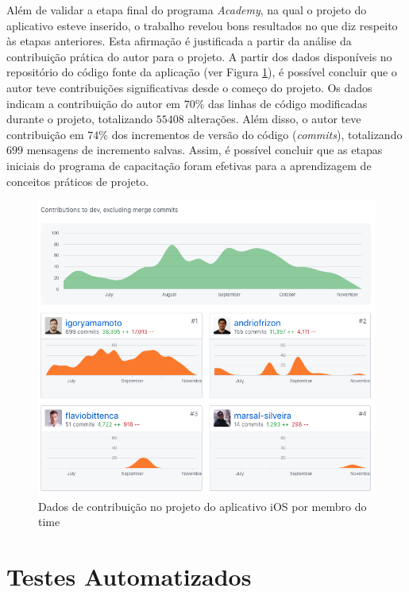 Além de validar a etapa final do programa \textit{Academy}, na qual o projeto do aplicativo esteve inserido, o trabalho revelou bons resultados no que diz respeito às etapas anteriores. Esta afirmação é justificada a partir da análise da contribuição prática do autor para o projeto. A partir dos dados disponíveis no repositório do código fonte da aplicação (ver Figura \ref{fig:github-stats}), é possível concluir que o autor teve contribuições significativas desde o começo do projeto. Os dados indicam a contribuição do autor em $70\%$ das linhas de código modificadas durante o projeto, totalizando $55408$ alterações. Além disso, o autor teve contribuição em $74\%$ dos incrementos de versão do código (\textit{commits}), totalizando $699$ mensagens de incremento salvas. Assim, é possível concluir que as etapas iniciais do programa de capacitação foram efetivas para a aprendizagem de conceitos práticos de projeto.
\begin{figure}[H]
    \centering
    \includegraphics[width=\textwidth]{pfc/figuras/github-stats.png}
    \caption{Dados de contribuição no projeto do aplicativo iOS por membro do time}
    \label{fig:github-stats}
\end{figure}

\section{Testes Automatizados}
